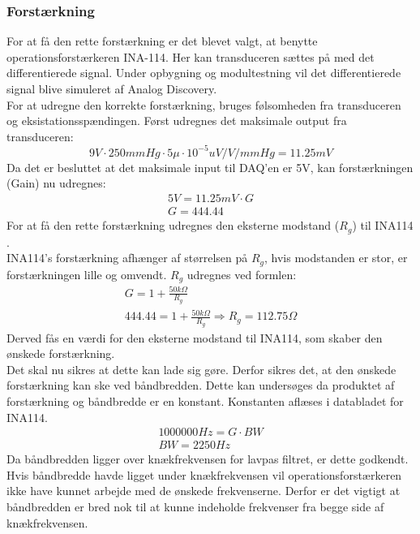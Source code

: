 \subsubsection{Forstærkning}
For at få den rette forstærkning er det blevet valgt, at benytte operationsforstærkeren INA-114. Her kan transduceren sættes på med det differentierede signal. Under opbygning og modultestning vil det differentierede signal blive simuleret af Analog Discovery. \\
For at udregne den korrekte forstærkning, bruges følsomheden fra transduceren og eksistationsspændingen.
Først udregnes det maksimale output fra transduceren:   
\begin{equation}
9V\cdot 250mmHg \cdot 5\mu\cdot 10^{-5} uV/V/mmHg  = 11.25mV
\end{equation} 
Da det er besluttet at det maksimale input til DAQ'en \cite{DSB} er 5V, kan forstærkningen (Gain) nu udregnes: 
\begin{equation}
\begin{split}
5V= 11.25mV \cdot G \\
G = 444.44
\end{split}
\end{equation}
For at få den rette forstærkning udregnes den eksterne modstand ($ R_g $) til INA114 \cite{INA}.\\ 
INA114's forstærkning afhænger af størrelsen på $ R_g $, hvis modstanden er stor, er forstærkningen lille og omvendt.  $ R_g $ udregnes ved formlen: 
\begin{equation}
\begin{split}
G=1+\frac{50k\Omega}{R_g}\\
444.44= 1+\frac{50k\Omega}{R_g} \Rightarrow R_g= 112.75 \Omega
\end{split}
\end{equation}
Derved fås en værdi for den eksterne modstand til INA114, som skaber den ønskede forstærkning.\\
Det skal nu sikres at dette kan lade sig gøre. Derfor sikres det, at den ønskede forstærkning kan ske ved båndbredden. Dette kan undersøges da produktet af forstærkning og båndbredde er en konstant. Konstanten aflæses i databladet for INA114\cite{INA}. 
\begin{equation}
\begin{split}
1000000 Hz = G\cdot BW \\
BW = 2250 Hz
\end{split}
\end{equation}
Da båndbredden ligger over knækfrekvensen for lavpas filtret, er dette godkendt. Hvis båndbredde havde ligget under knækfrekvensen vil operationsforstærkeren ikke have kunnet arbejde med de ønskede frekvenserne. Derfor er det vigtigt at båndbredden er bred nok til at kunne indeholde frekvenser fra begge side af knækfrekvensen.\\
